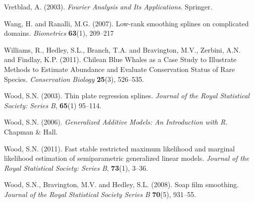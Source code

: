 \documentclass[useAMS, referee]{biom}
\begin{document}
\begin{thebibliography}{99}
\bibitem{} Vretblad, A. (2003). \textit{Fourier Analysis and Its Applications}. Springer.

\bibitem{} Wang, H. and Ranalli, M.G. (2007). Low-rank smoothing splines on complicated domains. \textit{Biometrics} \textbf{63}(1), 209--217

\bibitem{} Williams, R., Hedley, S.L., Branch, T.A. and Bravington, M.V., Zerbini, A.N. and Findlay, K.P. (2011). Chilean Blue Whales as a Case Study to Illustrate Methods to Estimate Abundance and Evaluate Conservation Status of Rare Species. \textit{Conservation Biology} \textbf{25}(3), 526--535.

\bibitem{} Wood, S.N. (2003). Thin plate regression splines. \textit{Journal of the Royal Statistical Society: Series B}, \textbf{65}(1) 95--114.

\bibitem{} Wood, S.N. (2006). \textit{Generalized Additive Models: An Introduction with R}. Chapman \& Hall.

\bibitem{} Wood, S.N. (2011). Fast stable restricted maximum likelihood and marginal likelihood estimation of semiparametric generalized linear models. \textit{Journal of the Royal Statistical Society: Series B}, \textbf{73}(1), 3--36.

\bibitem{} Wood, S.N., Bravington, M.V. and Hedley, S.L. (2008). Soap film smoothing. \textit{Journal of the Royal Statistical Society Series B} \textbf{70}(5), 931--55.

\end{thebibliography}


\label{lastpage}
\end{document}
